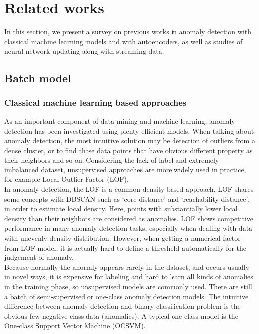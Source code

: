 \chapter{Related works}
\label{chap:related works}

In this section, we present a survey on previous works in anomaly detection with classical machine learning models and with autoencoders, as well as studies of neural network updating along with streaming data.

\section{Batch model}
\label{sec:batch}

\subsection{Classical machine learning based approaches}
\label{sec:classical}

As an important component of data mining and machine learning, anomaly detection has been investigated using plenty efficient models. When talking about anomaly detection, the most intuitive solution may be detection of outliers from a dense cluster, or to find those data points that have obvious different property as their neighbors and so on. Considering the lack of label and extremely imbalanced dataset, unsupervised approaches are more widely used in practice,
for example Local Outlier Factor (LOF).\\

In anomaly detection, the LOF is a common density-based approach. LOF shares some concepts with DBSCAN such as ‘core distance’ and ‘reachability distance’, in order to estimate local density. Here, points with substantially lower local density than their neighbors are considered as anomalies. LOF shows competitive performance in many anomaly detection tasks, especially when dealing with data with unevenly density distribution. However, when getting a numerical factor from LOF model, it is actually hard to define a threshold automatically for the judgement of anomaly.\\

Because normally the anomaly appears rarely in the dataset, and occurs usually in novel ways, it is expensive for labeling and hard to learn all kinds of anomalies in the training phase, so unsupervised models are commonly used. There are still a batch of semi-supervised or one-class anomaly detection models. The intuitive difference between anomaly detection and binary classification problem is the obvious few negative class data (anomalies). A typical one-class model is the One-class Support Vector Machine (OCSVM).\\


